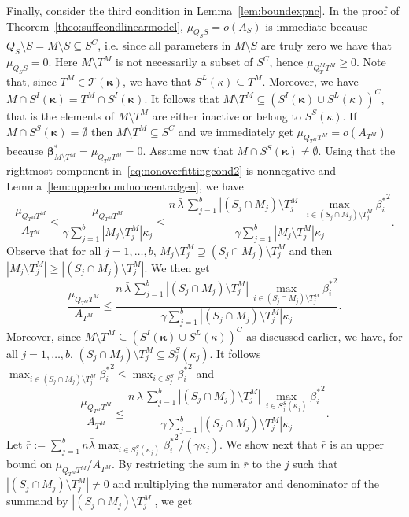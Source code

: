 \documentclass[
  12pt]{article}
\newcommand{\T}{\mathcal{T}}
\newcommand{\bbeta}{\boldsymbol{\beta}}
\newcommand{\bkappa}{\boldsymbol{\kappa}}
\begin{document}
Finally, consider the third condition in Lemma~\ref{lem:boundexpnc}.
In the proof of Theorem~\ref{theo:suffcondlinearmodel}, $\mu_{Q_SS}=o(A_S)$ is immediate because $ Q_S \setminus S= M\setminus S\subseteq S^C$, i.e. since all parameters in $M \setminus S$ are truly zero we have that $\mu_{Q_SS}=0$.
Here $M\setminus T^M$ is not necessarily a subset of $S^C$, hence $\mu_{Q_T^M T^M} \geq 0$. Note that, since $T^M\in\T(\bkappa)$, we have that $S^L(\kappa)\subseteq T^M$. Moreover, we have $M\cap S^{I}(\bkappa)=T^M\cap S^{I}(\bkappa)$. It follows that $M\setminus T^M\subseteq (S^{I}(\bkappa) \cup S^L(\kappa))^C$, that is the elements of $M\setminus T^M$ are either inactive or belong to $S^S(\kappa)$. If $M\cap S^{S}(\bkappa)=\emptyset$ then $M\setminus T^M\subseteq S^C$ and we immediately get $\mu_{Q_{T^M} T^M}=o(A_{T^M})$ because $\bbeta^*_{M \setminus T^M}=\mu_{Q_{T^M} T^M}=0$. Assume now that $M\cap S^{S}(\bkappa)\neq\emptyset$. Using that the rightmost component in~\eqref{eq:nonoverfittingcond2} is nonnegative and Lemma~\ref{lem:upperboundnoncentralgen}, we have
$$\frac{\mu_{Q_{T^M} T^M}}{ A_{T^M}} \leq \frac{\mu_{Q_{T^M} T^M}}{ \gamma\sum_{j=1}^b|M_j \setminus T^M_j|\kappa_j} \leq \frac{n\,\bar{\lambda}\,\sum_{j=1}^b|(S_j\cap M_j )\setminus T^M_j|\,\max_{i\in (S_j\cap M_j )\setminus T^M_j}{\beta_{i}^*}^2}{ \gamma\sum_{j=1}^b|M_j \setminus T^M_j|\kappa_j}.$$
Observe that for all $j=1,\ldots,b$, $M_j \setminus T^M_j \supseteq (S_j\cap M_j )\setminus T^M_j$ and then $|M_j \setminus T^M_j| \geq |(S_j\cap M_j )\setminus T^M_j|$. We then get
$$\frac{\mu_{Q_{T^M} T^M}}{ A_{T^M}} \leq \frac{n\,\bar{\lambda}\,\sum_{j=1}^b|(S_j\cap M_j )\setminus T^M_j|\,\max_{i\in(S_j\cap M_j )\setminus T^M_j}{\beta_{i}^*}^2}{ \gamma\sum_{j=1}^b|(S_j\cap M_j ) \setminus T^M_j|\kappa_j}.$$
Moreover, since  $M\setminus T^M\subseteq (S^{I}(\bkappa) \cup S^L(\kappa))^C$ as discussed earlier, we have, for all $j=1,\ldots,b$, $(S_j\cap M_j )\setminus T^M_j \subseteq S_j^{S}(\kappa_j)$. It follows $\max_{i\in(S_j\cap M_j )\setminus T^M_j}{\beta_{i}^*}^2 \leq \max_{i\in S_j^S}{\beta_{i}^*}^2$ and
\begin{equation}\label{eq:onbfsa}
  \frac{\mu_{Q_{T^M} T^M}}{ A_{T^M}} \leq \frac{n\,\bar{\lambda}\,\sum_{j=1}^b|(S_j\cap M_j )\setminus T^M_j|\,\max_{i\in S_j^{S}(\kappa_j)}{\beta_{i}^*}^2}{ \gamma\sum_{j=1}^b|(S_j\cap M_j ) \setminus T^M_j|\kappa_j}.  
\end{equation}
Let $\bar{r}:=\sum_{j=1}^b n\bar{\lambda}\max_{i\in S_j^{S}(\kappa_j)}{\beta_i^*}^2/(\gamma\kappa_j)$. We show next that $\bar{r}$ is an upper bound on $\mu_{Q_{T^M} T^M}/ A_{T^M}$. By restricting the sum in $\bar{r}$ to the $j$ such that $|(S_j\cap M_j )\setminus T^M_j|\neq 0$ and multiplying the numerator and denominator of the summand by $|(S_j\cap M_j )\setminus T^M_j|$, we get 
\end{document}
